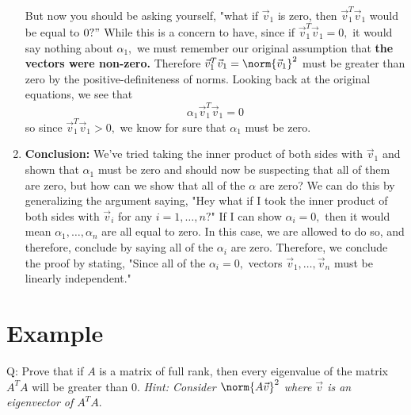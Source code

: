 \begin{enumerate}
 But now you should be asking yourself, "what if $\vec{v}_{1}$ is zero, then $\vec{v}_{1}^{T} \vec{v}_{1}$ would be equal to $0?"$ While this is a concern to have, since if $\vec{v}_{1}^{T} \vec{v}_{1} = 0,$ it would say nothing about $\alpha_{1},$ we must remember our original assumption that \textbf{the vectors were non-zero.} 
 Therefore $\vec{v}_{1}^{T} \vec{v}_{1} = \norm{\vec{v}_{1}}^{2}$ must be greater than zero by the positive-definiteness of norms. 
 Looking back at the original equations, we see that 
 $$\alpha_{1} \vec{v}_{1}^{T} \vec{v}_{1} = 0$$
 so since $\vec{v}_{1}^{T} \vec{v}_{1} > 0,$ we know for sure that $\alpha_{1}$ must be zero.

 \item \textbf{Conclusion:}
 We've tried taking the inner product of both sides with $\vec{v}_{1}$ and shown that $\alpha_{1}$ must be zero and should now be suspecting that all of them are zero, but how can we show that all of the $\alpha$ are zero? 
 We can do this by generalizing the argument saying, "Hey what if I took the inner product of both sides with $\vec{v}_{i}$ for any $i = 1, \dots, n?$" If I can show $\alpha_{i} = 0,$ then it would mean $\alpha_{1}, \dots, \alpha_{n}$ are all equal to zero. In this case, we are allowed to do so, and therefore, conclude by saying all of the $\alpha_{i}$ are zero. 
 Therefore, we conclude the proof by stating, "Since all of the $\alpha_{i} = 0,$ vectors $\vec{v}_{1}, \dots, \vec{v}_{n}$ must be linearly independent."

\end{enumerate}


\section{Example}

Q: Prove that if $A$ is a matrix of full rank, then every eigenvalue of the matrix $A^{T}A$ will be greater than $0.$ \textit{Hint: Consider $\norm{A\vec{v}}^{2}$ where $\vec{v}$ is an eigenvector of $A^{T}A.$}

